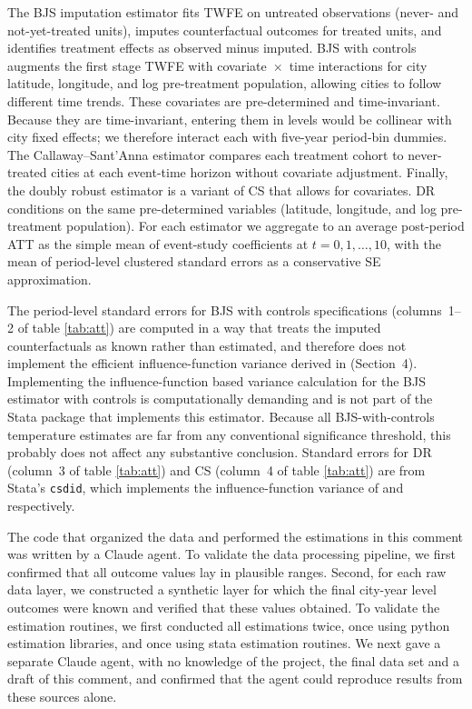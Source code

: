 \documentclass[12pt]{article}
\begin{document}
The BJS imputation
estimator \citep{Borusyak2024} fits TWFE on untreated observations (never- and not-yet-treated units), imputes
counterfactual outcomes for treated units, and identifies treatment effects as observed minus imputed.  BJS with controls augments the first stage TWFE with covariate~$\times$~time
interactions for city latitude, longitude, and log pre-treatment population,
allowing cities to follow different time trends.  These covariates are pre-determined and time-invariant.  Because they are time-invariant,
entering them in levels would be collinear with city fixed effects; we
therefore interact each with five-year period-bin dummies.
The Callaway--Sant'Anna estimator \citep{CS2021} compares each treatment cohort to never-treated cities at each event-time horizon without covariate adjustment.  Finally, the doubly robust estimator \citep{SantAnnaZhao2020} is a variant of CS that allows for covariates.  DR conditions on the same pre-determined variables (latitude, longitude, and log pre-treatment population).  For each estimator we aggregate to an average post-period ATT as the simple mean of event-study coefficients at $t = 0, 1, \ldots, 10$,
with the mean of period-level clustered standard errors as a conservative SE
approximation.

The period-level standard errors for BJS with controls specifications (columns~1--2 of table \ref{tab:att}) are computed in a way that treats the imputed counterfactuals as known rather than estimated, and therefore does not implement the efficient influence-function variance derived in \citet{Borusyak2024} (Section~4). Implementing the influence-function based variance calculation for the BJS estimator with controls is computationally demanding and is not part of the Stata package that implements this estimator.   Because all BJS-with-controls temperature estimates
are far from any conventional significance threshold, this
probably does not affect any substantive conclusion.  Standard errors for DR (column~3 of table \ref{tab:att}) and CS (column~4 of table \ref{tab:att}) are from Stata's \texttt{csdid}, which implements the influence-function variance of \citet{SantAnnaZhao2020} and \citet{CS2021} respectively.

The code that organized the data and performed the estimations in this comment was written by a Claude agent. To validate the data processing pipeline, we first confirmed that all outcome values lay in plausible ranges. Second, for each raw data layer, we constructed a synthetic layer for which the final city-year level outcomes were known and verified that these values obtained. To validate the estimation routines, we first conducted all estimations twice, once using python estimation libraries, and once using stata estimation routines. We next gave a separate Claude agent, with no knowledge of the project, the final data set and a draft of this comment, and confirmed that the agent could reproduce results from these sources alone.
\end{document}
